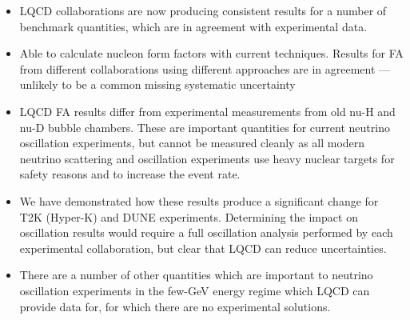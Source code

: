 
\begin{itemize}
\item LQCD collaborations are now producing consistent results for a number of benchmark quantities, which are in agreement with experimental data.
\item Able to calculate nucleon form factors with current techniques. Results for FA from different collaborations using different approaches are in agreement --- unlikely to be a common missing systematic uncertainty
\item LQCD FA results differ from experimental measurements from old nu-H and nu-D bubble chambers. These are important quantities for current neutrino oscillation experiments, but cannot be measured cleanly as all modern neutrino scattering and oscillation experiments use heavy nuclear targets for safety reasons and to increase the event rate.
\item We have demonstrated how these results produce a significant change for T2K (Hyper-K) and DUNE experiments. Determining the impact on oscillation results would require a full oscillation analysis performed by each experimental collaboration, but clear that LQCD can reduce uncertainties.
\item There are a number of other quantities which are important to neutrino oscillation experiments in the few-GeV energy regime which LQCD can provide data for, for which there are no experimental solutions.
\end{itemize}
